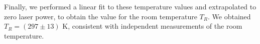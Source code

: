 \documentclass[journal=nalefd,manuscript=letter]{achemso}
\begin{document}
Finally, we performed a linear fit to these temperature values and extrapolated to 
zero laser power, to obtain the value for the room temperature $T_R$. 
We obtained $T_R = (297 \pm 13)$ K, consistent with independent measurements of the room temperature. 



%
\end{document}
